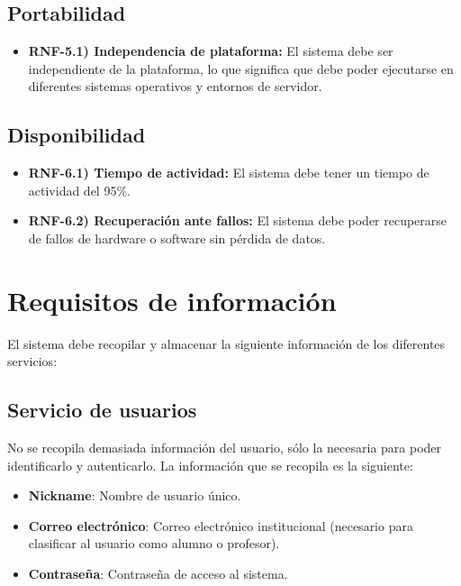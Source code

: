 \subsection{Portabilidad}

\begin{itemize}
    \item \textbf{RNF-5.1) Independencia de plataforma:} El sistema debe ser independiente de la plataforma, lo que significa que debe poder ejecutarse en diferentes sistemas operativos y entornos de servidor.
\end{itemize}

\subsection{Disponibilidad}

\begin{itemize}
    \item \textbf{RNF-6.1) Tiempo de actividad:} El sistema debe tener un tiempo de actividad del 95\%.
    \item \textbf{RNF-6.2) Recuperación ante fallos:} El sistema debe poder recuperarse de fallos de hardware o software sin pérdida de datos.
\end{itemize}

\section{Requisitos de información}

El sistema debe recopilar y almacenar la siguiente información de los diferentes servicios:

\subsection{Servicio de usuarios}
No se recopila demasiada información del usuario, sólo la necesaria para poder identificarlo y autenticarlo. La información que se recopila es la siguiente:

\begin{itemize}
    \item \textbf{Nickname}: Nombre de usuario único.
    \item \textbf{Correo electrónico}: Correo electrónico institucional (necesario para clasificar al usuario como alumno o profesor).
    \item \textbf{Contraseña}: Contraseña de acceso al sistema.
\end{itemize}

